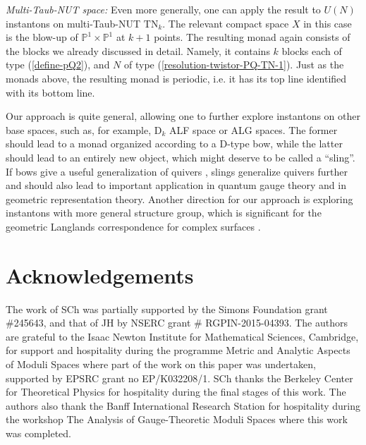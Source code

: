 \documentclass[12pt]{article}
\theoremstyle{definition}
\theoremstyle{remark}
\numberwithin{theorem}{section}
\begin{document}
 {\it Multi-Taub-NUT space:} Even more generally, one can apply the result to $U(N)$ instantons on multi-Taub-NUT $\mathrm{TN}_k.$ The relevant compact space $X$ in this case is the blow-up of $\mathbb{P}^1\times\mathbb{P}^1$ at $k+1$ points. The resulting monad again consists of the blocks we already discussed in detail.  Namely, it contains $k$ blocks each of type (\ref{define-pQ2}), and $N$ of type (\ref {resolution-twistor-PQ-TN-1}).  Just as the monads above, the resulting monad is periodic, i.e. it has its top line identified with its bottom line.

Our approach is quite general, allowing one to further explore instantons on other base spaces, such as, for example, D$_k$ ALF space or ALG spaces.  The former should lead to a monad organized according to a D-type bow, while the latter should lead to an entirely new object, which might deserve to be called a ``sling''.  If bows give a useful generalization of quivers \cite{Nakajima:2016guo}, slings generalize quivers further and should also lead to important application in quantum gauge theory and in geometric representation theory.  Another direction for our approach is exploring instantons with more general structure group, which is significant for the geometric Langlands correspondence for complex surfaces \cite{Witten:2009at}.  
 
  
 
 
\section*{Acknowledgements}
The work of SCh was partially supported by the Simons Foundation grant {\footnotesize\#}245643, and that of JH by NSERC grant  {\footnotesize\#} RGPIN-2015-04393. 
The authors are grateful to the Isaac Newton Institute for Mathematical Sciences, Cambridge, for support and hospitality during the programme Metric and Analytic Aspects of Moduli Spaces where part of the work on this paper was undertaken, supported by EPSRC grant no EP/K032208/1.  SCh thanks the Berkeley Center for Theoretical Physics for hospitality during the final stages of this work. 
The authors also thank  the
Banff International Research Station for hospitality during the workshop
The Analysis of Gauge-Theoretic Moduli Spaces where this work was completed.
\end{document}
